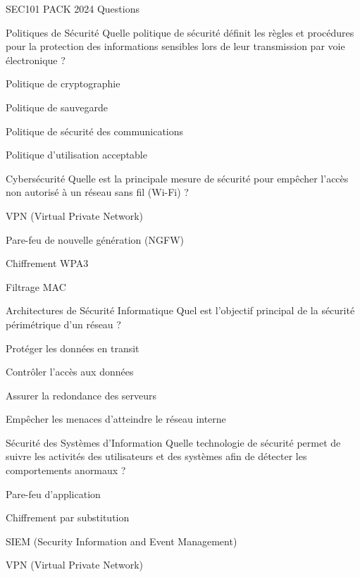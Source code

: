 \documentclass[12pt]{article}
\begin{document}
\begin{quiz}{SEC101 PACK 2024 Questions}
  \begin{multi}[points=1]{Politiques de Sécurité}
    Quelle politique de sécurité définit les règles et procédures pour la protection des informations sensibles lors de leur transmission par voie électronique ?
    \item Politique de cryptographie
    \item Politique de sauvegarde
    \item* Politique de sécurité des communications
    \item Politique d'utilisation acceptable
  \end{multi}

  \begin{multi}[points=1]{Cybersécurité}
    Quelle est la principale mesure de sécurité pour empêcher l'accès non autorisé à un réseau sans fil (Wi-Fi) ?
    \item VPN (Virtual Private Network)
    \item Pare-feu de nouvelle génération (NGFW)
    \item* Chiffrement WPA3
    \item Filtrage MAC
  \end{multi}

  \begin{multi}[points=1]{Architectures de Sécurité Informatique}
    Quel est l'objectif principal de la sécurité périmétrique d'un réseau ?
    \item Protéger les données en transit
    \item Contrôler l'accès aux données
    \item Assurer la redondance des serveurs
    \item* Empêcher les menaces d'atteindre le réseau interne
  \end{multi}

  \begin{multi}[points=1]{Sécurité des Systèmes d'Information}
    Quelle technologie de sécurité permet de suivre les activités des utilisateurs et des systèmes afin de détecter les comportements anormaux ?
    \item Pare-feu d'application
    \item Chiffrement par substitution
    \item* SIEM (Security Information and Event Management)
    \item VPN (Virtual Private Network)
  \end{multi}


\end{quiz}
\end{document}
